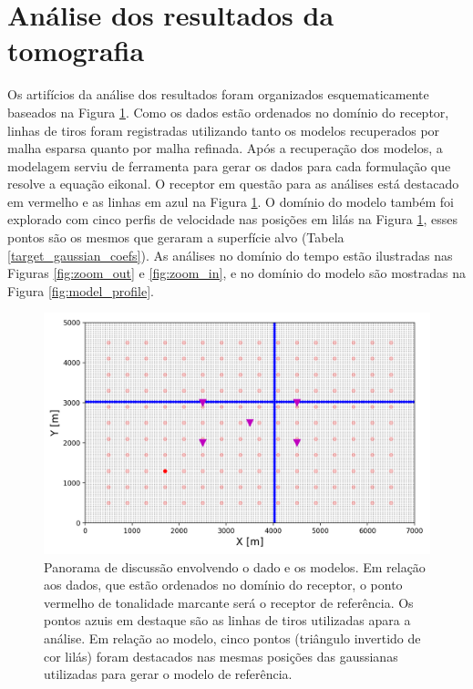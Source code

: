 \section{Análise dos resultados da tomografia} 
 
Os artifícios da análise dos resultados foram organizados esquematicamente baseados na Figura \ref{fig:discuss_geometry}. Como os dados estão ordenados no domínio do receptor, linhas de tiros foram registradas utilizando tanto os modelos recuperados por malha esparsa quanto por malha refinada. Após a recuperação dos modelos, a modelagem serviu de ferramenta para gerar os dados para cada formulação que resolve a equação eikonal. O receptor em questão para as análises está destacado em vermelho e as linhas em azul na Figura \ref{fig:discuss_geometry}. O domínio do modelo também foi explorado com cinco perfis de velocidade nas posições em lilás na Figura \ref{fig:discuss_geometry}, esses pontos são os mesmos que geraram a superfície alvo (Tabela \ref{target_gaussian_coefs}). As análises no domínio do tempo estão ilustradas nas Figuras \ref{fig:zoom_out} e \ref{fig:zoom_in}, e no domínio do modelo são mostradas na Figura \ref{fig:model_profile}. 
 
\begin{figure}[H]
	\centering
	\includegraphics[width=12cm,height=7cm]{Imgs/Discussoes/discuss_geometry.png}
	\caption{Panorama de discussão envolvendo o dado e os modelos. Em relação aos dados, que estão ordenados no domínio do receptor, o ponto vermelho de tonalidade marcante será o receptor de referência. Os pontos azuis em destaque são as linhas de tiros utilizadas apara a análise. Em relação ao modelo, cinco pontos (triângulo invertido de cor lilás) foram destacados nas mesmas posições das gaussianas utilizadas para gerar o modelo de referência.}
	\label{fig:discuss_geometry}	
\end{figure}

